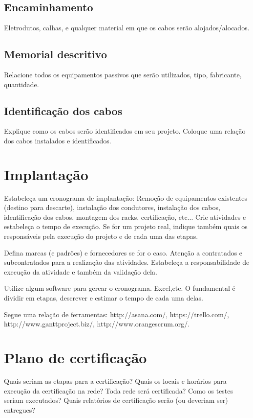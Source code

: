 \documentclass[	DIV=calc,%
							paper=a4,%
							fontsize=12pt,%
							onecolumn]{scrartcl}	 					%
\begin{document}
\subsection{Encaminhamento}
Eletrodutos, calhas, e qualquer material em que os cabos serão alojados/alocados.

\subsection{Memorial descritivo}

Relacione todos os equipamentos passivos que serão utilizados, tipo, fabricante, quantidade.

\subsection{Identificação dos cabos}
Explique como os cabos serão identificados em seu projeto. Coloque uma relação dos cabos instalados e identificados.

\section{Implantação}
Estabeleça um cronograma de implantação:
Remoção de equipamentos existentes (destino para descarte), instalação dos condutores, instalação dos cabos, 
identificação dos cabos, montagem dos racks, certificação, etc... Crie atividades e estabeleça o tempo de execução. Se for um projeto real, indique também quais os responsáveis pela execução do projeto e de cada uma das etapas.

Defina marcas (e padrões) e fornecedores se for o caso. Atenção a contratados e subcontratados para a realização das atividades. Estabeleça a responsabilidade de execução da atividade e também da validação dela.

Utilize algum software para gerear o cronograma. Excel,etc. O fundamental é dividir em etapas, descrever e estimar o tempo de cada uma delas.

Segue uma relação de ferramentas:
http://asana.com/, 
https://trello.com/, 
http://www.ganttproject.biz/, 
http://www.orangescrum.org/. 

\section{Plano de certificação}
Quais seriam as etapas para a certificação? 
Quais os locais e horários para execução da certificação na rede? Toda rede será certificada?
Como os testes seriam executados?
Quais relatórios de certificação serão (ou deveriam ser) entregues? 
\end{document}
